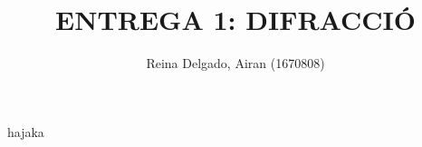 \documentclass[a4paper, 11pt]{article}
\title{{\textbf{\Large ENTREGA 1: DIFRACCIÓ
}\\}}
\author{Reina Delgado, Airan (1670808)\\}
\date{}
\begin{document}
\maketitle


hajaka


\end{document}
